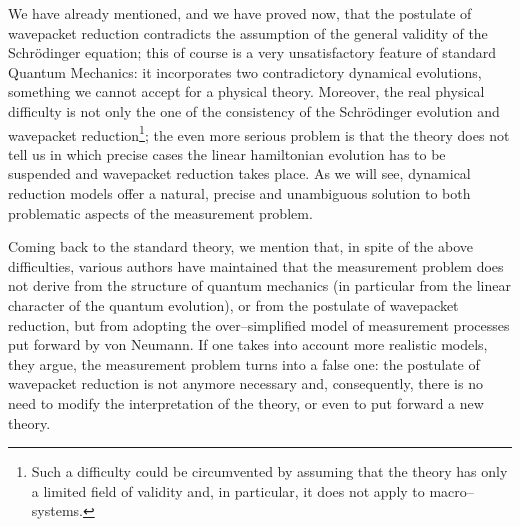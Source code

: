 \documentclass[12pt]{article}
\begin{document}
We have already mentioned, and we have proved now, that the
postulate of wavepacket reduction contradicts the assumption of
the general validity of the Schr\"odinger equation; this of course
is a very unsatisfactory feature of standard Quantum Mechanics: it
incorporates two contradictory dynamical evolutions, something we
cannot accept for a physical theory. Moreover, the real physical
difficulty is not only the one of the consistency of the
Schr\"odinger evolution and wavepacket reduction\footnote{Such a
difficulty could be circumvented by assuming that the theory has
only a limited field of validity and, in particular, it does not
apply to macro--systems.}; the even more serious problem is that
the theory does not tell us in which precise cases the linear
hamiltonian evolution has to be suspended and wavepacket reduction
takes place. As we will see, dynamical reduction models offer a
natural, precise and unambiguous solution to both problematic
aspects of the measurement problem.

Coming back to the standard theory, we mention that, in spite of
the above difficulties, various authors \cite{pri,zur1,zu,lib}
have maintained that the measurement problem does not derive from
the structure of quantum mechanics (in  particular from the linear
character of the quantum evolution), or from the postulate of
wavepacket reduction, but from adopting the over--simplified model
of measurement processes put forward by von Neumann. If one takes
into account more realistic models, they argue, the measurement
problem turns into a false one: the postulate of wavepacket
reduction is not anymore necessary and, consequently, there is no
need to modify the interpretation of the theory, or even to put
forward a new theory.
\end{document}
